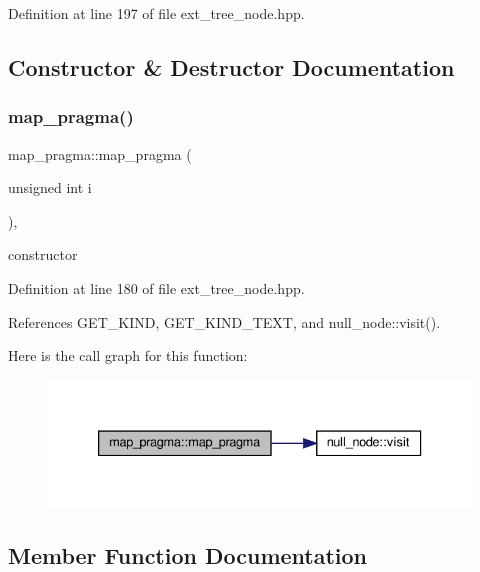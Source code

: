 Definition at line 197 of file ext\+\_\+tree\+\_\+node.\+hpp.



\subsection{Constructor \& Destructor Documentation}
\mbox{\label{structmap__pragma_a521029a52b648ec3632efc646e12e901}} 
\subsubsection{\texorpdfstring{map\+\_\+pragma()}{map\_pragma()}}
{\footnotesize\ttfamily map\+\_\+pragma\+::map\+\_\+pragma (\begin{DoxyParamCaption}\item[{unsigned int}]{i }\end{DoxyParamCaption})\hspace{0.3cm}{\ttfamily [inline]}, {\ttfamily [explicit]}}



constructor 



Definition at line 180 of file ext\+\_\+tree\+\_\+node.\+hpp.



References G\+E\+T\+\_\+\+K\+I\+ND, G\+E\+T\+\_\+\+K\+I\+N\+D\+\_\+\+T\+E\+XT, and null\+\_\+node\+::visit().

Here is the call graph for this function\+:
\nopagebreak
\begin{figure}[H]
\begin{center}
\leavevmode
\includegraphics[width=333pt]{de/d12/structmap__pragma_a521029a52b648ec3632efc646e12e901_cgraph}
\end{center}
\end{figure}


\subsection{Member Function Documentation}
\mbox{\label{structmap__pragma_a418af88fad63d1e91a1d1b12bc19b70c}} 
